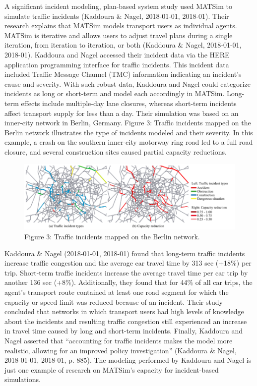 \documentclass[fancy, oneside, mastersfancy, ms]{byuthesis}
\begin{document}
A significant incident modeling, plan-based system study used MATSim to
simulate traffic incidents (Kaddoura \& Nagel, 2018-01-01, 2018-01).
Their research explains that MATSim models transport users as individual
agents. MATSim is iterative and allows users to adjust travel plans
during a single iteration, from iteration to iteration, or both
(Kaddoura \& Nagel, 2018-01-01, 2018-01). Kaddoura and Nagel accessed
their incident data via the HERE application programming interface for
traffic incidents. This incident data included Traffic Message Channel
(TMC) information indicating an incident's cause and severity. With such
robust data, Kaddoura and Nagel could categorize incidents as long or
short-term and model each accordingly in MATSim. Long-term effects
include multiple-day lane closures, whereas short-term incidents affect
transport supply for less than a day. Their simulation was based on an
inner-city network in Berlin, Germany. Figure 3: Traffic incidents
mapped on the Berlin network illustrates the type of incidents modeled
and their severity. In this example, a crash on the southern inner-city
motorway ring road led to a full road closure, and several construction
sites caused partial capacity reductions.

\begin{figure}

{\centering \includegraphics{figures/fig3.png}

}

\caption{Figure 3: Traffic incidents mapped on the Berlin network.}

\end{figure}

Kaddoura \& Nagel (2018-01-01, 2018-01) found that long-term traffic
incidents increase traffic congestion and the average car travel time by
313 sec (+18\%) per trip. Short-term traffic incidents increase the
average travel time per car trip by another 136 sec (+8\%).
Additionally, they found that for 44\% of all car trips, the agent's
transport route contained at least one road segment for which the
capacity or speed limit was reduced because of an incident. Their study
concluded that networks in which transport users had high levels of
knowledge about the incidents and resulting traffic congestion still
experienced an increase in travel time caused by long and short-term
incidents. Finally, Kaddoura and Nagel asserted that ``accounting for
traffic incidents makes the model more realistic, allowing for an
improved policy investigation'' (Kaddoura \& Nagel, 2018-01-01, 2018-01,
p. 885). The modeling performed by Kaddoura and Nagel is just one
example of research on MATSim's capacity for incident-based simulations.
\end{document}
